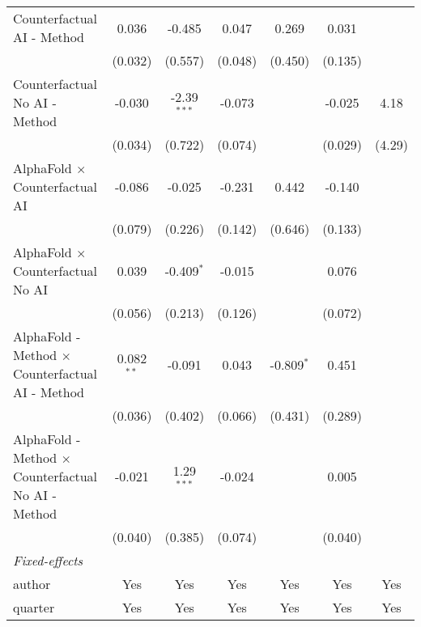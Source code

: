 \begin{tabular}{lcccccc}
   Counterfactual AI - Method                                 & 0.036         & -0.485        & 0.047   & 0.269         & 0.031          &   \\   
                                                              & (0.032)       & (0.557)       & (0.048) & (0.450)       & (0.135)        &   \\   
   Counterfactual No AI - Method                              & -0.030        & -2.39$^{***}$ & -0.073  &               & -0.025         & 4.18\\   
                                                              & (0.034)       & (0.722)       & (0.074) &               & (0.029)        & (4.29)\\   
   AlphaFold $\times$ Counterfactual AI                       & -0.086        & -0.025        & -0.231  & 0.442         & -0.140         &   \\   
                                                              & (0.079)       & (0.226)       & (0.142) & (0.646)       & (0.133)        &   \\   
   AlphaFold $\times$ Counterfactual No AI                    & 0.039         & -0.409$^{*}$  & -0.015  &               & 0.076          &   \\   
                                                              & (0.056)       & (0.213)       & (0.126) &               & (0.072)        &   \\   
   AlphaFold - Method $\times$ Counterfactual AI - Method     & 0.082$^{**}$  & -0.091        & 0.043   & -0.809$^{*}$  & 0.451          &   \\   
                                                              & (0.036)       & (0.402)       & (0.066) & (0.431)       & (0.289)        &   \\   
   AlphaFold - Method $\times$ Counterfactual No AI - Method  & -0.021        & 1.29$^{***}$  & -0.024  &               & 0.005          &   \\   
                                                              & (0.040)       & (0.385)       & (0.074) &               & (0.040)        &   \\   
   \midrule
   \emph{Fixed-effects}\\
   author                                                     & Yes           & Yes           & Yes     & Yes           & Yes            & Yes\\  
   quarter                                                    & Yes           & Yes           & Yes     & Yes           & Yes            & Yes\\  

\end{tabular}
